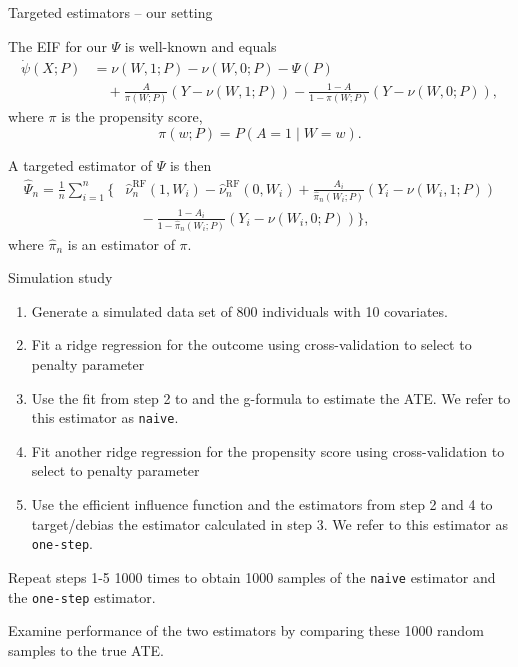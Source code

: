 \documentclass[smaller]{beamer}\usepackage{listings}
\newcommand{\1}{\mathds{1}}
\begin{document}
\begin{frame}[label={sec:orgcfecb75}]{Targeted estimators -- our setting}
\small

The EIF for our \(\Psi\) is well-known
\citep[e.g.,][]{kennedy2016semiparametric,kennedy2022semiparametric,hines2022demystifying}
and equals
\begin{align*}
  \dot{\psi}(X; P)
  & = \nu(W, 1; P) - \nu(W, 0;P)
    - \Psi(P)
  \\
  & \quad
    + \frac{A}{\pi(W;P)}(Y - \nu(W, 1; P))
    - \frac{1-A}{1-\pi(W;P)}(Y - \nu(W, 0;P)),
\end{align*}
where $\pi$ is the propensity score,
\begin{equation*}
  \pi(w; P) = P(A=1 \mid W=w).
\end{equation*}

\vfill

A targeted estimator of \(\Psi\) is then
\begin{align*}
  \hat{\Psi}_n= 
  \frac{1}{n}\sum_{i=1}^{n}
  \Big\{
  &
    \hat{\nu}_n^{\text{RF}}(1, W_i) - \hat{\nu}_n^{\text{RF}}(0, W_i)
    + \frac{A_i}{\hat{\pi}_n(W_i;P)}(Y_i - \nu(W_i, 1; P))
  \\
  & \quad
    - \frac{1-A_i}{1-\hat{\pi}_n(W_i;P)}(Y_i - \nu(W_i, 0;P))
    \Big\},
\end{align*}
where $\hat{\pi}_n$ is an estimator of $\pi$.
\end{frame}



\begin{frame}[label={sec:orgaf1fe4d},fragile]{Simulation study}
 \small

\begin{enumerate}
\item Generate a simulated data set of 800 individuals with 10 covariates.
\item Fit a ridge regression for the outcome using cross-validation to select
to penalty parameter
\item Use the fit from step 2 to and the g-formula to estimate the ATE. We refer to
this estimator as \texttt{naive}.
\item Fit another ridge regression for the propensity score using cross-validation
to select to penalty parameter
\item Use the efficient influence function and the estimators from step 2 and 4 to
target/debias the estimator calculated in step 3. We refer to this estimator
as \texttt{one-step}.
\end{enumerate}


\vfill

Repeat steps 1-5 1000 times to obtain 1000 samples of the \texttt{naive} estimator and
the \texttt{one-step} estimator.

\vfill

Examine performance of the two estimators by comparing these 1000 random samples
to the true ATE.
\end{frame}
\end{document}
